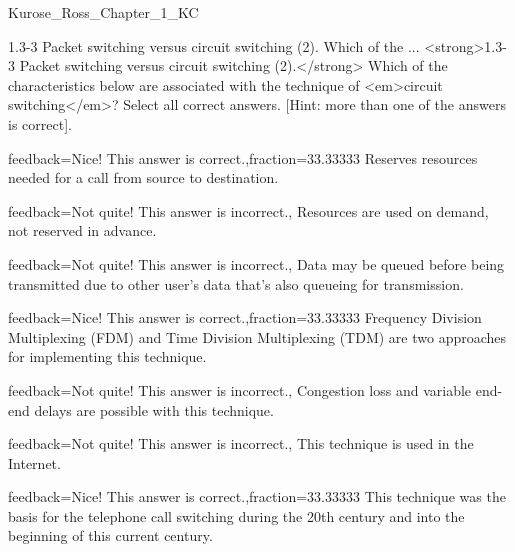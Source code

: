 \documentclass[a4paper]{article}
\begin{document}
\begin{quiz}{Kurose_Ross_Chapter_1_KC}
\begin{multi}[
	points=1,
	penalty=0.33333,
	multiple,
]{1.3-3 Packet switching versus circuit switching (2).  Which of the ...}
<strong>1.3-3 Packet switching versus circuit switching (2).</strong>  Which of the characteristics below are associated with the technique of <em>circuit switching</em>? Select all correct answers. [Hint: more than one of the answers is correct].
\item[feedback={Nice! This answer is correct.},fraction=33.33333] Reserves resources needed for a call from source to destination.
\item[feedback={Not quite! This answer is incorrect.},] Resources are used on demand, not reserved in advance.
\item[feedback={Not quite! This answer is incorrect.},] Data may be queued before being transmitted due to other user’s data that’s also queueing for transmission.
\item[feedback={Nice! This answer is correct.},fraction=33.33333] Frequency Division Multiplexing (FDM) and Time Division Multiplexing (TDM) are two approaches for implementing this technique.
\item[feedback={Not quite! This answer is incorrect.},] Congestion loss and variable end-end delays are possible with this technique.
\item[feedback={Not quite! This answer is incorrect.},] This technique is used in the Internet.
\item[feedback={Nice! This answer is correct.},fraction=33.33333] This technique was the basis for the telephone call switching during the 20th century and into the beginning of this current century.
\end{multi}


\end{quiz}
\end{document}

